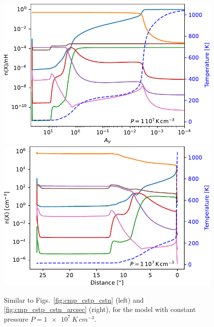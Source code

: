\documentclass[12pt,a4paper]{article}
\begin{document}
\begin{figure}[h!]
    \vspace{2em}

    \includegraphics[width=.48\textwidth]{struct_P1e7.pdf}
    \includegraphics[width=.48\textwidth]{struct_P1e7_arcsec.pdf}
    \caption{Similar to Figs.~\ref{fig:cmp_cstp_cstn} (left) and \ref{fig:cmp_cstp_cstn_arcsec} (right), for the model with constant pressure $P = \qty{1e7}{K\,cm^{-3}}$.} \label{fig:struct_P1e7}

\end{figure}

\clearpage
\end{document}
